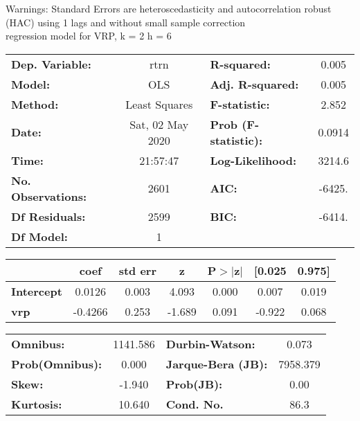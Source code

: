 Warnings: \newline
 [1] Standard Errors are heteroscedasticity and autocorrelation robust (HAC) using 1 lags and without small sample correction\\ 

regression model for VRP, k = 2 h = 6\begin{center}
\begin{tabular}{lclc}
\toprule
\textbf{Dep. Variable:}    &       rtrn       & \textbf{  R-squared:         } &     0.005   \\
\textbf{Model:}            &       OLS        & \textbf{  Adj. R-squared:    } &     0.005   \\
\textbf{Method:}           &  Least Squares   & \textbf{  F-statistic:       } &     2.852   \\
\textbf{Date:}             & Sat, 02 May 2020 & \textbf{  Prob (F-statistic):} &   0.0914    \\
\textbf{Time:}             &     21:57:47     & \textbf{  Log-Likelihood:    } &    3214.6   \\
\textbf{No. Observations:} &        2601      & \textbf{  AIC:               } &    -6425.   \\
\textbf{Df Residuals:}     &        2599      & \textbf{  BIC:               } &    -6414.   \\
\textbf{Df Model:}         &           1      & \textbf{                     } &             \\
\bottomrule
\end{tabular}
\begin{tabular}{lcccccc}
                   & \textbf{coef} & \textbf{std err} & \textbf{z} & \textbf{P$> |$z$|$} & \textbf{[0.025} & \textbf{0.975]}  \\
\midrule
\textbf{Intercept} &       0.0126  &        0.003     &     4.093  &         0.000        &        0.007    &        0.019     \\
\textbf{vrp}       &      -0.4266  &        0.253     &    -1.689  &         0.091        &       -0.922    &        0.068     \\
\bottomrule
\end{tabular}
\begin{tabular}{lclc}
\textbf{Omnibus:}       & 1141.586 & \textbf{  Durbin-Watson:     } &    0.073  \\
\textbf{Prob(Omnibus):} &   0.000  & \textbf{  Jarque-Bera (JB):  } & 7958.379  \\
\textbf{Skew:}          &  -1.940  & \textbf{  Prob(JB):          } &     0.00  \\
\textbf{Kurtosis:}      &  10.640  & \textbf{  Cond. No.          } &     86.3  \\
\bottomrule
\end{tabular}
\end{center}

